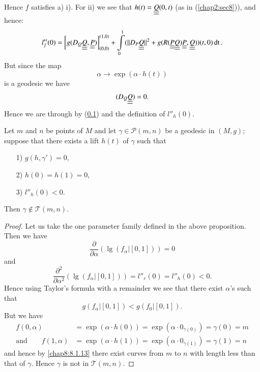 \setcounter{subsection}{10}
\subsection{}\label{chap8:8.1.11}
Hence $f$ satisfies a) i). For ii) we see that $h(t)=\underline{\underline{Q}}(0,t)$ (as
in (\ref{chap2:sec8})), and hence:
$$
l''_{f}(0)=\left[g(D_{Q}\underline{\underline{Q}},\underline{\underline{P}})\right]^{(1,0)}_{(0,0)}+\int\limits^{1}_{0}(||D_{P}\underline{\underline{Q}}||^{2}+g(R(\underline{\underline{P}}\underline{\underline{Q}})\underline{\underline{P}},\underline{\underline{Q}}))(t,0)\operatorname{dt}. 
$$
But since the map
$$
\alpha\to \exp(\alpha\cdot h(t))
$$
is a geodesic we have
$$
(D_{Q}\underline{\underline{Q}})=0.
$$
Hence we are through by (\ref{chap8:8.1.11}) and the definition of
$l''_{h}(0)$. 

\setcounter{coro}{11}
\begin{coro}\label{chap8:coro8.1.12}
Let $m$ and $n$ be points of $M$ and let $\gamma\in\mathscr{P}(m,n)$
be a geodesic in $(M,g)$; suppose that there exists a lift $h(t)$ of
$\gamma$ such that
\begin{itemize}
\item[\rm 1)] $g(h,\gamma')=0$,

\item[\rm 2)] $h(0)=h(1)=0$,

\item[\rm 3)] $l''_{h}(0)<0$.
\end{itemize}
Then $\gamma\not\in \mathscr{T}(m,n)$.
\end{coro}

\begin{proof}
Let us take the one parameter family defined in the above
proposition. Then we have
$$
\frac{\partial}{\partial\alpha}(\lg(f_{\alpha}|[0,1]))=0
$$
and\pageoriginale
$$
\frac{\partial^{2}}{\partial
  \alpha^{2}}(\lg(f_{\alpha}|[0,1]))=l''_{r}(0)=l''_{h}(0)<0.
$$
Hence using Taylor's formula with a remainder we see that there exist
$\alpha$'s such that
\begin{equation*}
g(f_{\alpha}|[0,1])<g(f_{0}|[0,1]).\tag{8.1.13}\label{chap8:8.1.13}
\end{equation*}
But we have
\begin{align*}
f(0,\alpha) &= \exp(\alpha\cdot h(0))=\exp(\alpha\cdot
0_{\gamma(0)})=\gamma(0)=m\\
\text{and}\qquad f(1,\alpha) &= \exp(\alpha\cdot
h(1))=\exp(\alpha\cdot 0_{\gamma(1)})=\gamma(1)=n
\end{align*}
and hence by \eqref{chap8:8.1.13} there exist curves from $m$ to $n$ with
length less than that of $\gamma$. Hence $\gamma$ is not in
$\mathscr{T}(m,n)$. 
\end{proof}

